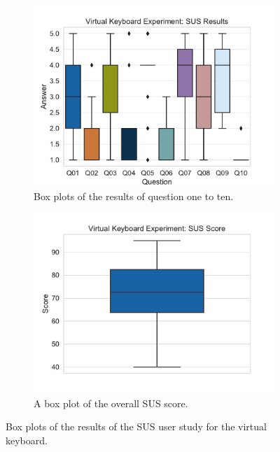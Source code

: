 \begin{figure}[H]
	\centering
	\begin{subfigure}[t]{.5\linewidth}%
		\centering
		\includegraphics[width=\linewidth]{figures/evaluation/res_exp_vk.pdf}
		\caption{Box plots of the results of question one to ten.}\label{fig:res-exp-vk}
	\end{subfigure}%
	\begin{subfigure}[t]{.5\linewidth}%
		\centering
		\includegraphics[width=\linewidth]{figures/evaluation/score_exp_vk.pdf}
		\caption{A box plot of the overall \gls{SUS} score.}\label{fig:score-exp-vk}
	\end{subfigure}%
	\caption[Virtual keyboard SUS results]{Box plots of the results of the \gls{SUS} user study for the virtual keyboard.}\label{fig:exp-vk-stats}
\end{figure}

